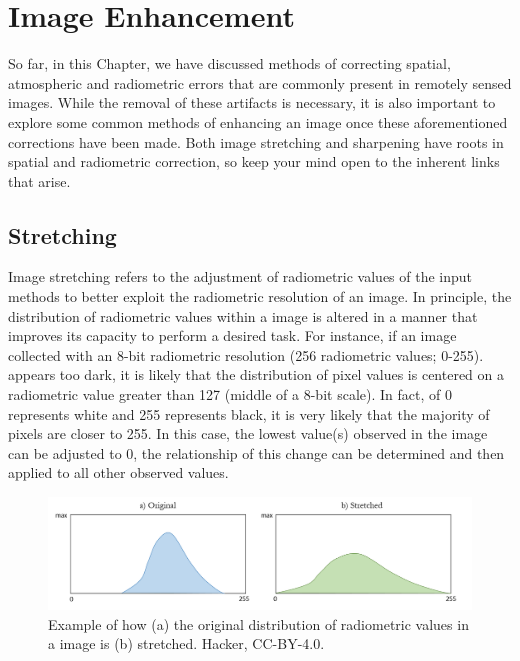\documentclass[
]{book}
\begin{document}
\hypertarget{image-enhancement}{%
\section{Image Enhancement}\label{image-enhancement}}

So far, in this Chapter, we have discussed methods of correcting spatial, atmospheric and radiometric errors that are commonly present in remotely sensed images. While the removal of these artifacts is necessary, it is also important to explore some common methods of enhancing an image once these aforementioned corrections have been made. Both image stretching and sharpening have roots in spatial and radiometric correction, so keep your mind open to the inherent links that arise.

\hypertarget{stretching}{%
\subsection{Stretching}\label{stretching}}

Image stretching refers to the adjustment of radiometric values of the input methods to better exploit the radiometric resolution of an image. In principle, the distribution of radiometric values within a image is altered in a manner that improves its capacity to perform a desired task. For instance, if an image collected with an 8-bit radiometric resolution (256 radiometric values; 0-255). appears too dark, it is likely that the distribution of pixel values is centered on a radiometric value greater than 127 (middle of a 8-bit scale). In fact, of 0 represents white and 255 represents black, it is very likely that the majority of pixels are closer to 255. In this case, the lowest value(s) observed in the image can be adjusted to 0, the relationship of this change can be determined and then applied to all other observed values.

\begin{figure}
\includegraphics[width=1\linewidth]{images/13-stretch} \caption{Example of how (a) the original distribution of radiometric values in a image is (b) stretched. Hacker, CC-BY-4.0.}\label{fig:13-stretch}
\end{figure}
\end{document}
